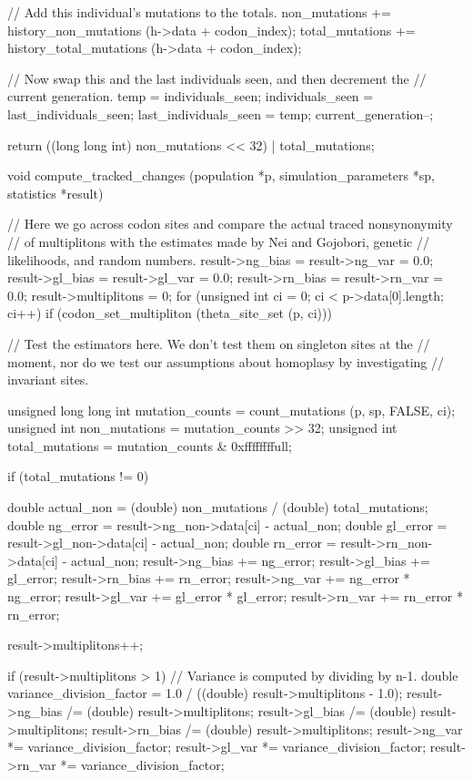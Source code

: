 \documentclass{article}
\begin{document}
\begin{ccode}
{{{        // Add this individual's mutations to the totals.
        non_mutations += history_non_mutations (h->data + codon_index);
        total_mutations += history_total_mutations (h->data + codon_index);
      }

    // Now swap this and the last individuals seen, and then decrement the
    // current generation.
    temp = individuals_seen;
    individuals_seen = last_individuals_seen;
    last_individuals_seen = temp;
    current_generation--;
  }

  return ((long long int) non_mutations << 32) | total_mutations;
}

void compute_tracked_changes (population *p, simulation_parameters *sp, statistics *result) {
  // Here we go across codon sites and compare the actual traced nonsynonymity
  // of multiplitons with the estimates made by Nei and Gojobori, genetic
  // likelihoods, and random numbers.
  result->ng_bias = result->ng_var = 0.0;
  result->gl_bias = result->gl_var = 0.0;
  result->rn_bias = result->rn_var = 0.0;
  result->multiplitons = 0;
  for (unsigned int ci = 0; ci < p->data[0].length; ci++)
    if (codon_set_multipliton (theta_site_set (p, ci))) {
      // Test the estimators here. We don't test them on singleton sites at the
      // moment, nor do we test our assumptions about homoplasy by investigating
      // invariant sites.

      unsigned long long int mutation_counts = count_mutations (p, sp, FALSE, ci);
      unsigned int	     non_mutations   = mutation_counts >> 32;
      unsigned int	     total_mutations = mutation_counts & 0xffffffffull;

      if (total_mutations != 0) {
        double actual_non = (double) non_mutations /
			    (double) total_mutations;
        double ng_error = result->ng_non->data[ci] - actual_non;
        double gl_error = result->gl_non->data[ci] - actual_non;
        double rn_error = result->rn_non->data[ci] - actual_non;
        result->ng_bias += ng_error;
        result->gl_bias += gl_error;
        result->rn_bias += rn_error;
        result->ng_var += ng_error * ng_error;
        result->gl_var += gl_error * gl_error;
        result->rn_var += rn_error * rn_error;

        result->multiplitons++;
      }
    }

  if (result->multiplitons > 1) {
    // Variance is computed by dividing by n-1.
    double variance_division_factor = 1.0 / ((double) result->multiplitons - 1.0);
    result->ng_bias /= (double) result->multiplitons;
    result->gl_bias /= (double) result->multiplitons;
    result->rn_bias /= (double) result->multiplitons;
    result->ng_var *= variance_division_factor;
    result->gl_var *= variance_division_factor;
    result->rn_var *= variance_division_factor;
  }
}
\end{ccode}
\end{document}
